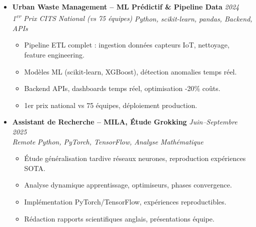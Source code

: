 \documentclass[a4paper,11pt]{article}
\begin{document}
\begin{itemize}[leftmargin=*, label={-}]
        \begin{itemize}[leftmargin=0.4cm, nosep, label=\tiny$\bullet$]
            \item \small{4 agents IA collaboratifs (Gemini LLM + RAG), orchestration Google ADK avanc\'ee.}
            \item \small{Backend FastAPI : APIs agents, intégration OpenWeather/Marchés agricoles.}
            \item \small{Pipelines LangChain optimisés, prompts avanc\'es, chaînage agents complexe.}
            \item \small{Docker reproducibilité, tests robustesse, documentation système.}
        \end{itemize}
    \vspace{3pt}
    \item \textbf{Urban Waste Management -- ML Pr\'edictif \& Pipeline Data} \hfill \textit{2024} \\
    \textit{1\textsuperscript{er} Prix CITS National (vs 75 \'equipes)} \hfill \textit{Python, scikit-learn, pandas, Backend, APIs}
    \vspace{-2pt}
        \begin{itemize}[leftmargin=0.4cm, nosep, label=\tiny$\bullet$]
            \item \small{Pipeline ETL complet : ingestion donn\'ees capteurs IoT, nettoyage, feature engineering.}
            \item \small{Modèles ML (scikit-learn, XGBoost), détection anomalies temps r\'eel.}
            \item \small{Backend APIs, dashboards temps r\'eel, optimisation -20\% coûts.}
            \item \small{1er prix national vs 75 équipes, déploiement production.}
        \end{itemize}
    \vspace{3pt}
    \item \textbf{Assistant de Recherche -- MILA, \'Etude Grokking} \hfill \textit{Juin--Septembre 2025} \\
    \textit{Remote} \hfill \textit{Python, PyTorch, TensorFlow, Analyse Math\'ematique}
    \vspace{-2pt}
        \begin{itemize}[leftmargin=0.4cm, nosep, label=\tiny$\bullet$]
            \item \small{\'Etude généralisation tardive réseaux neurones, reproduction expériences SOTA.}
            \item \small{Analyse dynamique apprentissage, optimiseurs, phases convergence.}
            \item \small{Implémentation PyTorch/TensorFlow, expériences reproductibles.}
            \item \small{Rédaction rapports scientifiques anglais, présentations équipe.}
        \end{itemize}
\end{itemize}
\end{document}
